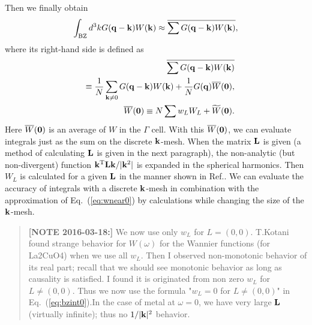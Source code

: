 \documentclass[a4paper,10pt,fleqn]{article}
\newcommand{\bfzero}{{\bf 0}}
\newcommand{\bfq}{{\bf q}}
\newcommand{\bfk}{{\bf k}}
\newcommand{\req}[1]{\mbox{Eq.~(\ref{#1})}}
\begin{document}
Then we finally obtain
\begin{eqnarray}
\int_{\rm BZ} d^3k G(\bfq-\bfk) W(\bfk) 
\approx \overline{\sum G(\bfq-\bfk) W(\bfk)},\label{eq:bzintbar}
\end{eqnarray}
where its right-hand side is defined as
\begin{eqnarray}
&&\overline{\sum G(\bfq-\bfk) W(\bfk)} \nonumber \\
&&\equiv 
\frac{1}{N} \sum_{\bfk \ne 0} G(\bfq-\bfk) W(\bfk) + \frac{1}{N} G(\bfq)\overline{W}(\bfzero),\\
&&\overline{W}(\bfzero)\equiv N\sum w_L W_L + \widetilde{W}(\bfzero).
\end{eqnarray}
Here $\overline{W}(\bfzero)$ is an %
average of $W$ in the $\Gamma$ cell.
With this $\overline{W}(\bfzero)$, we can 
evaluate integrals just as the sum on the discrete $\bfk$-mesh.
When the matrix ${\bf L}$ is given 
(a method of calculating ${\bf L}$ is given in the next paragraph),
the non-analytic (but non-divergent) function 
${\bfk^{\rm T}{\bf L}\bfk}/|\bfk^2|$ 
is expanded in the spherical harmonics. Then
$W_L$ is calculated for a given ${\bf L}$ in the manner shown in Ref.\cite{friedrich_efficient_2010}. 
We can evaluate the accuracy of integrals with a discrete $\bfk$-mesh
in combination with the approximation of \req{eq:wnear0} 
by calculations while changing the size of the $\bfk$-mesh.\\

\begin{quote}
{\noindent \bf [NOTE 2016-03-18:]}
We now use only $w_L$ for $L=(0,0)$.
T.Kotani found strange behavior for $W(\omega)$ for the Wannier
functions (for La2CuO4) when we use all $w_L$.
Then I observed non-monotonic behavior of its real part; recall that
 we should see monotonic behavior as long as causality is satisfied.
I found it is originated from non zero $w_L$ for $L\ne(0,0)$. 
Thus we now use the formula "$w_L=0$ for $L\ne(0,0)$" in
 \req{eq:bzint0}.In the case of metal at $\omega=0$, we have very large
${\bf L}$ (virtually infinite); thus no $1/|{\bf k}|^2$ behavior.\\
\end{quote}

\end{document}
